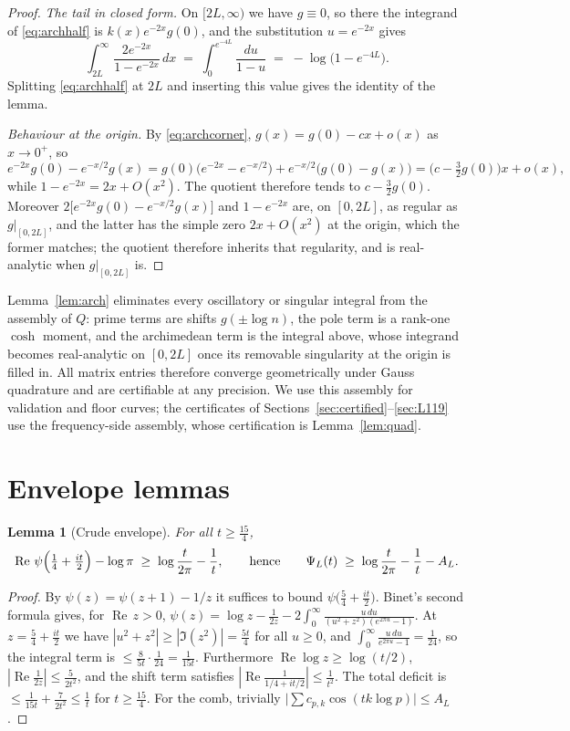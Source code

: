 ﻿\documentclass[11pt]{article}
\newtheorem{lemma}[theorem]{Lemma}
\newcommand{\Rey}{\operatorname{Re}}
\begin{document}
\begin{proof}
\emph{The tail in closed form.}  On $[2L,\infty)$ we have $g\equiv0$, so
there the integrand of \eqref{eq:archhalf} is $k(x)e^{-2x}g(0)$, and
the substitution $u=e^{-2x}$ gives
\[
  \int_{2L}^\infty\frac{2e^{-2x}}{1-e^{-2x}}\,dx
  \;=\;\int_0^{e^{-4L}}\frac{du}{1-u}
  \;=\;-\log\bigl(1-e^{-4L}\bigr) .
\]
Splitting \eqref{eq:archhalf} at $2L$ and inserting this value gives the
identity of the lemma.

\emph{Behaviour at the origin.}  By \eqref{eq:archcorner},
$g(x)=g(0)-cx+o(x)$ as $x\to0^+$, so
\[
  e^{-2x}g(0)-e^{-x/2}g(x)
  =g(0)\bigl(e^{-2x}-e^{-x/2}\bigr)+e^{-x/2}\bigl(g(0)-g(x)\bigr)
  =\bigl(c-\tfrac32g(0)\bigr)x+o(x),
\]
while $1-e^{-2x}=2x+O(x^2)$.  The quotient therefore tends to
$c-\frac32g(0)$.  Moreover $2\bigl[e^{-2x}g(0)-e^{-x/2}g(x)\bigr]$ and
$1-e^{-2x}$ are, on $[0,2L]$, as regular as $g|_{[0,2L]}$, and the
latter has the simple zero $2x+O(x^2)$ at the origin, which the former
matches; the quotient therefore inherits that regularity, and is
real-analytic when $g|_{[0,2L]}$ is.
\end{proof}

Lemma~\ref{lem:arch} eliminates every oscillatory or singular integral
from the assembly of $Q$: prime terms are shifts $g(\pm\log n)$, the
pole term is a rank-one $\cosh$ moment, and the archimedean term is
the integral above, whose integrand becomes real-analytic on $[0,2L]$
once its removable singularity at the origin is filled in.  All matrix
entries therefore converge geometrically under Gauss quadrature and are
certifiable at any precision.  We use this assembly for validation and floor curves; the
certificates of Sections~\ref{sec:certified}--\ref{sec:L119} use the
frequency-side assembly, whose certification is Lemma~\ref{lem:quad}.

\section{Envelope lemmas}\label{sec:envelope}

\begin{lemma}[Crude envelope]\label{lem:envelope}
For all $t\ge\frac{15}4$,
\[
\Rey\,\psi\Bigl(\tfrac14+\tfrac{it}2\Bigr)-\log\pi
\;\ge\;\log\frac t{2\pi}-\frac1t ,
\qquad\text{hence}\qquad
\Psi_L(t)\;\ge\;\log\frac t{2\pi}-\frac1t-A_L .
\]
\end{lemma}

\begin{proof}
By $\psi(z)=\psi(z+1)-1/z$ it suffices to bound
$\psi\bigl(\tfrac54+\tfrac{it}2\bigr)$.  Binet's second formula gives,
for $\Rey\,z>0$,
$\psi(z)=\log z-\frac1{2z}-2\int_0^\infty
\frac{u\,du}{(u^2+z^2)(e^{2\pi u}-1)}$.
At $z=\frac54+\frac{it}2$ we have
$|u^2+z^2|\ge|\Im(z^2)|=\frac{5t}4$ for all $u\ge0$, and
$\int_0^\infty\frac{u\,du}{e^{2\pi u}-1}=\frac1{24}$, so the integral
term is $\le\frac{8}{5t}\cdot\frac1{24}=\frac1{15t}$.  Furthermore
$\Rey\log z\ge\log(t/2)$, $|\Rey\frac1{2z}|\le\frac{5}{2t^2}$, and the
shift term satisfies $|\Rey\frac1{1/4+it/2}|\le\frac1{t^2}$.  The
total deficit is $\le\frac1{15t}+\frac7{2t^2}\le\frac1t$ for
$t\ge\frac{15}4$.  For the comb, trivially
$\bigl|\sum c_{p,k}\cos(tk\log p)\bigr|\le A_L$.
\end{proof}
\end{document}

